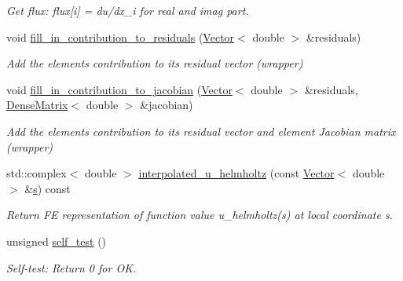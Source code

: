 \begin{DoxyCompactItemize}
\begin{DoxyCompactList}\small\item\em Get flux\+: flux\mbox{[}i\mbox{]} = du/dx\+\_\+i for real and imag part. \end{DoxyCompactList}\item 
void \hyperlink{classoomph_1_1HelmholtzEquations_a78f38997ee311a4cd710f0f595de1f3c}{fill\+\_\+in\+\_\+contribution\+\_\+to\+\_\+residuals} (\hyperlink{classoomph_1_1Vector}{Vector}$<$ double $>$ \&residuals)
\begin{DoxyCompactList}\small\item\em Add the element\textquotesingle{}s contribution to its residual vector (wrapper) \end{DoxyCompactList}\item 
void \hyperlink{classoomph_1_1HelmholtzEquations_ad9a09d4ac9e2321e7655cbe86a4d6d60}{fill\+\_\+in\+\_\+contribution\+\_\+to\+\_\+jacobian} (\hyperlink{classoomph_1_1Vector}{Vector}$<$ double $>$ \&residuals, \hyperlink{classoomph_1_1DenseMatrix}{Dense\+Matrix}$<$ double $>$ \&jacobian)
\begin{DoxyCompactList}\small\item\em Add the element\textquotesingle{}s contribution to its residual vector and element Jacobian matrix (wrapper) \end{DoxyCompactList}\item 
std\+::complex$<$ double $>$ \hyperlink{classoomph_1_1HelmholtzEquations_a935e41d545053199a77f7b9f494c9a5b}{interpolated\+\_\+u\+\_\+helmholtz} (const \hyperlink{classoomph_1_1Vector}{Vector}$<$ double $>$ \&\hyperlink{cfortran_8h_ab7123126e4885ef647dd9c6e3807a21c}{s}) const
\begin{DoxyCompactList}\small\item\em Return FE representation of function value u\+\_\+helmholtz(s) at local coordinate s. \end{DoxyCompactList}\item 
unsigned \hyperlink{classoomph_1_1HelmholtzEquations_a24ce807aa74efd08b3cde1fc74fbfc72}{self\+\_\+test} ()
\begin{DoxyCompactList}\small\item\em Self-\/test\+: Return 0 for OK. \end{DoxyCompactList}\end{DoxyCompactItemize}
